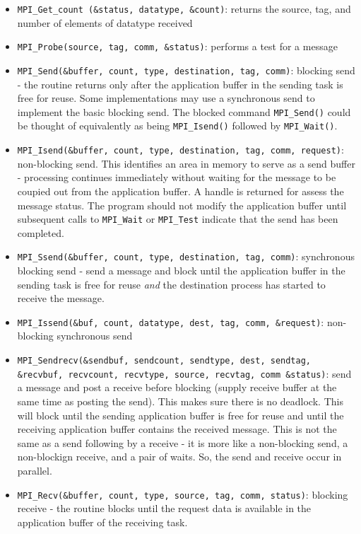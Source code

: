 \documentclass[10pt]{article}
\begin{document}
\begin{flushleft}
\begin{itemize}
\item {\tt MPI\_Get\_count (\&status, datatype, \&count)}: returns the source, tag, and number of elements of datatype received
\item {\tt MPI\_Probe(source, tag, comm, \&status)}: performs a test for a message
\item {\tt MPI\_Send(\&buffer, count, type, destination, tag, comm)}: blocking send - the routine returns only after the application buffer in the sending task is free for reuse. Some implementations may use a synchronous send to implement the basic blocking send. The blocked command {\tt MPI\_Send()} could be thought of equivalently as being {\tt MPI\_Isend()} followed by {\tt MPI\_Wait()}. 
\item {\tt MPI\_Isend(\&buffer, count, type, destination, tag, comm, request)}: non-blocking send. This identifies an area in memory to serve as a send buffer - processing continues immediately without waiting for the message to be coupied out from the application buffer. A handle is returned for assess the message status. The program should not modify the application buffer until subsequent calls to {\tt MPI\_Wait} or {\tt MPI\_Test} indicate that the send has been completed.
\item {\tt MPI\_Ssend(\&buffer, count, type, destination, tag, comm)}: synchronous blocking send - send a message and block until the application buffer in the sending task is free for reuse \textit{and} the destination process has started to receive the message. 
\item {\tt MPI\_Issend(\&buf, count, datatype, dest, tag, comm, \&request)}: non-blocking synchronous send
\item {\tt MPI\_Sendrecv(\&sendbuf, sendcount, sendtype, dest, sendtag, \&recvbuf, recvcount, recvtype, source, recvtag, comm \&status)}: send a message and post a receive before blocking (supply receive buffer at the same time as posting the send). This makes sure there is no deadlock. This will block until the sending application buffer is free for reuse and until the receiving application buffer contains the received message. This is not the same as a send following by a receive - it is more like a non-blocking send, a non-blockign receive, and a pair of waits. So, the send and receive occur in parallel. 
\item {\tt MPI\_Recv(\&buffer, count, type, source, tag, comm, status)}: blocking receive - the routine blocks until the request data is available in the application buffer of the receiving task. 

\end{itemize}
\end{flushleft}
\end{document}
